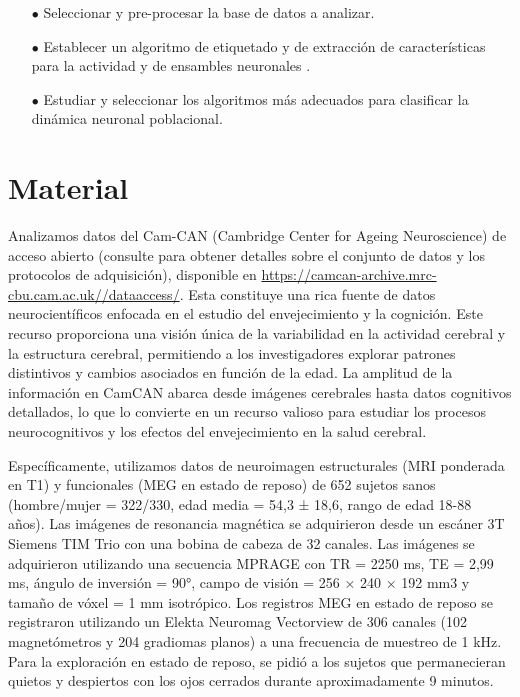 \documentclass[11pt,letterpaper]{article}
\numberwithin{equation}{subsection}
\numberwithin{table}{subsection}
\begin{document}
\begin{itemize}

	\item [$\bullet$] Seleccionar y pre-procesar la base de datos a analizar.
	\item [$\bullet$] Establecer un algoritmo de etiquetado y de extracción de características para la actividad y de ensambles neuronales . 
	\item [$\bullet$] Estudiar y seleccionar los algoritmos más adecuados para clasificar la dinámica neuronal poblacional. 

\end{itemize}


\section{Material}

\smallskip
\noindent Analizamos datos del Cam-CAN (Cambridge Center for Ageing Neuroscience) de acceso abierto (consulte \cite{shafto2014cambridge, taylor2017cambridge} para obtener detalles sobre el conjunto de datos y los protocolos de adquisición), disponible en \url{https://camcan-archive.mrc-cbu.cam.ac.uk//dataaccess/}. Esta constituye una rica fuente de datos neurocientíficos enfocada en el estudio del envejecimiento y la cognición. Este recurso proporciona una visión única de la variabilidad en la actividad cerebral y la estructura cerebral, permitiendo a los investigadores explorar patrones distintivos y cambios asociados en función de la edad. La amplitud de la información en CamCAN abarca desde imágenes cerebrales hasta datos cognitivos detallados, lo que lo convierte en un recurso valioso para estudiar los procesos neurocognitivos y los efectos del envejecimiento en la salud cerebral.

\bigskip
\noindent Específicamente, utilizamos datos de neuroimagen estructurales (MRI ponderada en T1) y funcionales (MEG en estado de reposo) de 652 sujetos sanos (hombre/mujer = 322/330, edad media = 54,3 ± 18,6, rango de edad 18-88 años). Las imágenes de resonancia magnética se adquirieron desde un escáner 3T Siemens TIM Trio con una bobina de cabeza de 32 canales. Las imágenes se adquirieron utilizando una secuencia MPRAGE con TR = 2250 ms, TE = 2,99 ms, ángulo de inversión = 90°, campo de visión = 256 × 240 × 192 mm3 y tamaño de vóxel = 1 mm isotrópico. Los registros MEG en estado de reposo se registraron utilizando un Elekta Neuromag Vectorview de 306 canales (102 magnetómetros y 204 gradiomas planos) a una frecuencia de muestreo de 1 kHz. Para la exploración en estado de reposo, se pidió a los sujetos que permanecieran quietos y despiertos con los ojos cerrados durante aproximadamente 9 minutos.
\end{document}
